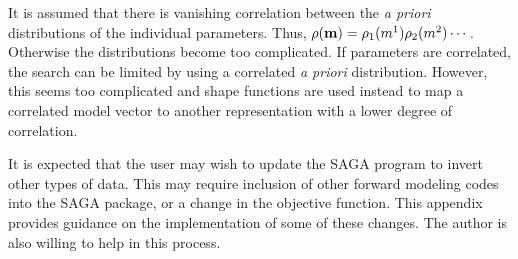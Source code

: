 \documentclass{saclantc}
\begin{document}
It is assumed that there is
    vanishing correlation between the {\it a priori} distributions
  of the individual parameters.
     Thus, $\rho({\bf m}) = \rho_1(m^1)\rho_2(m^2)\cdots $.
Otherwise the distributions become too
complicated.
If  parameters are correlated, the search can be limited by using 
a correlated  {\it a priori} distribution. 
%
However, this seems too complicated and shape functions
are used instead to map a correlated  model vector to another representation with a
lower degree of correlation.
  



It is expected that the user may  wish to update the {\sf SAGA} program
to invert other types of data. This may require  inclusion of
other forward modeling codes into the {\sf SAGA} package, or a change in
the objective function. 
This appendix provides guidance on the implementation of some of these changes.
The author is also willing to help in this process.
 
\end{document}
